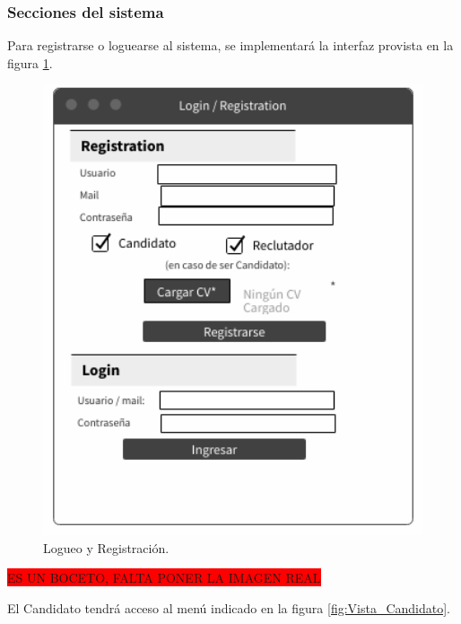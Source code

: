 \documentclass[12pt,a4paper]{article}
\begin{document}
\begin{sloppypar}
\cleardoublepage

\subsubsection{Secciones del sistema}

Para registrarse o loguearse al sistema, se implementará la interfaz provista en la figura \ref{fig:Vista_Registro}.

\begin{figure}[H]    %
  \centering
  \includegraphics[width=1\textwidth]{images/Vista_Registro.png}
  \caption{Logueo y Registración.}  
  \label{fig:Vista_Registro}
\end{figure}

\colorbox{red}{ES UN BOCETO, FALTA PONER LA IMAGEN REAL}

El Candidato tendrá acceso al menú indicado en la figura \ref{fig:Vista_Candidato}. 


\end{sloppypar}
\end{document}
